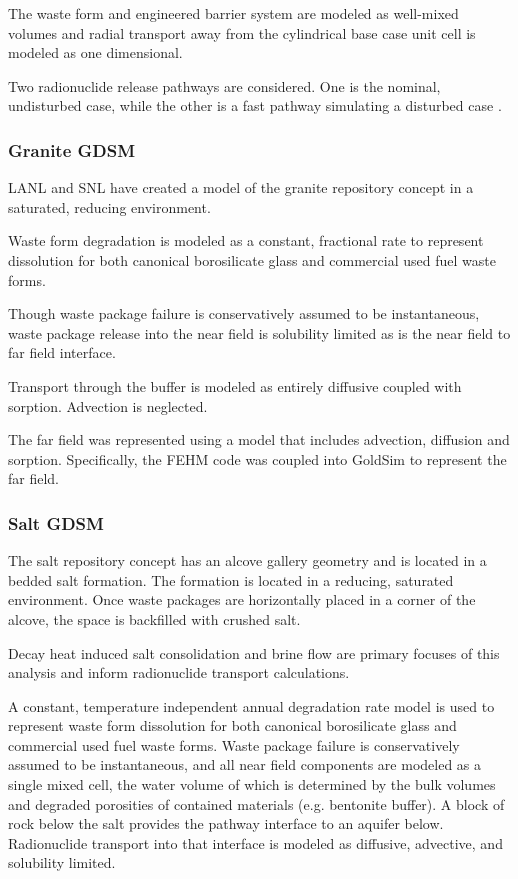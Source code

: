 {The waste form and engineered barrier system are modeled as well-mixed volumes 
and radial transport away from the cylindrical base case unit cell is modeled as  
one dimensional.

Two radionuclide release pathways are considered. One is the nominal, undisturbed 
case, while the other is a fast pathway simulating a disturbed case
\cite{clayton_generic_2011}.


\subsubsection{Granite GDSM}

\gls{LANL} and \gls{SNL} have created a model of the granite repository concept  
in a saturated, reducing environment.

Waste form degradation is modeled as a constant, fractional rate to represent 
dissolution for both canonical borosilicate glass and commercial used fuel 
waste forms.  

Though waste package failure is conservatively assumed to be instantaneous,
waste package release into the near field is solubility limited as is the near 
field to far field interface. 

Transport through the buffer is modeled as entirely diffusive coupled with 
sorption. Advection is neglected.

The far field was represented using a model that includes advection, diffusion 
and sorption. Specifically, the \gls{FEHM} code was coupled into GoldSim to 
represent the far field.

\subsubsection{Salt GDSM}

The salt repository concept has an alcove gallery geometry and is located in a 
bedded salt formation. The formation is located in a reducing, saturated 
environment. Once waste packages  are horizontally placed in a corner of the 
alcove, the space is backfilled with crushed salt. 

Decay heat induced salt consolidation and brine flow are primary focuses of 
this analysis and inform radionuclide transport calculations. 

A constant, temperature independent annual degradation rate model is used to 
represent waste form dissolution for both canonical borosilicate glass and 
commercial used fuel waste forms. Waste package failure is conservatively 
assumed to be instantaneous, and all near field components are modeled as a 
single mixed cell, the water volume of which is determined by the bulk volumes 
and degraded porosities of contained materials (e.g. bentonite buffer). A block  
of rock below the salt provides the pathway interface to an aquifer below. 
Radionuclide transport into that interface is modeled as diffusive, advective, and 
solubility limited.

}
